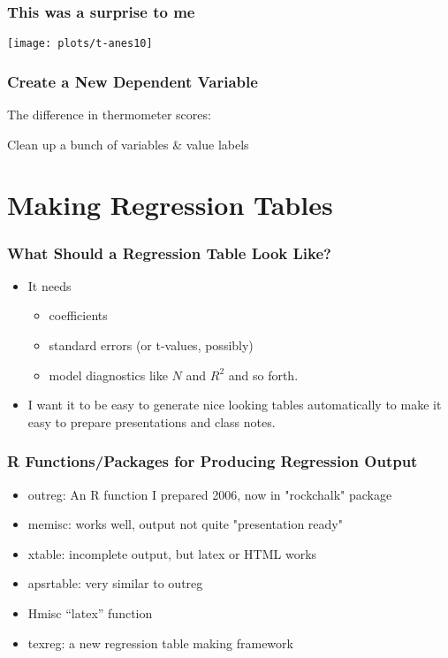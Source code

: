 \documentclass[11pt,english]{beamer}
\def\lyxframeend{} %
\def\Sweavesize{\normalsize}
\begin{document}
\begin{frame}[containsverbatim]
\frametitle{This was a surprise to me}


\texttt{[image: plots/t-anes10]}

\end{frame}

\begin{frame}
\frametitle{Create a New Dependent Variable}


The difference in thermometer scores:

\def\Sweavesize{\scriptsize}



Clean up a bunch of variables \& value labels



\end{frame}


\lyxframeend{}\section{Making Regression Tables}

\begin{frame}
\frametitle{What Should a Regression Table Look Like?}
\begin{itemize}
\item It needs 

\begin{itemize}
\item coefficients
\item standard errors (or t-values, possibly)
\item model diagnostics like $N$ and $R^{2}$ and so forth.
\end{itemize}
\item I want it to be easy to generate nice looking tables automatically
to make it easy to prepare presentations and class notes.
\end{itemize}
\end{frame}


\begin{frame}
  \frametitle {R Functions/Packages for Producing Regression Output}
  \begin{itemize}
  \item outreg: An R function I prepared 2006, now in "rockchalk" package
  \item memisc: works well, output not quite "presentation ready"
  \item xtable: incomplete output, but latex or HTML works 
  \item apsrtable: very similar to outreg
  \item Hmisc ``latex'' function
  \item texreg: a new regression table making framework
  \end{itemize}    
\end{frame}
\end{document}
